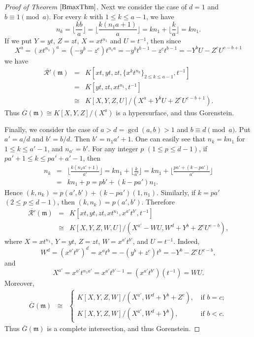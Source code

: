 \documentclass[12pt]{amsart}
\theoremstyle{definition}
\theoremstyle{remark}
\numberwithin{equation}{section}
\newcommand{\m}{\mathfrak m}
\renewcommand{\:}{\colon}
\begin{document}
\begin{proof}[Proof of Theorem $\ref{BmaxThm}$]
\par \vspace{2mm}
Next we consider the case of $d=1$ and $b \equiv 1 \pmod{a}$. 
For every $k$ with $1 \le k \le a-1$, we have 
\[
n_k
=\lfloor \frac{kb}{a} \rfloor 
= \lfloor \frac{k(n_1a+1)}{a} \rfloor
=kn_1+ \lfloor \dfrac{k}{a} \rfloor = kn_1. 
\]
If we put $Y=yt$, $Z=zt$, $X=xt^{n_1}$ and $U=t^{-1}$,  
then since 
\[
X^a=(xt^{n_1})^a=(-y^b-z^c)t^{n_1a} 
=-y^bt^{b-1}-z^c t^{b-1} 
= -Y^bU-Z^cU^{c-b+1} 
\]
we have 
\begin{eqnarray*}
\overline{\mathcal{R}'}(\m) &=& 
 K[xt, yt, zt, \{x^kt^{n_k}\}_{2 \le k \le a-1}, t^{-1}] \\
&=&  K[yt,zt,xt^{n_1},t^{-1}] \\
& \cong &  K[X,Y,Z,U]/(X^a+Y^bU+Z^cU^{c-b+1}). 
\end{eqnarray*}
Thus $\overline{G}(\m) \cong  K[X,Y,Z]/(X^a)$ is 
a hypersurface, and thus Gorenstein. 
\par \vspace{2mm} 
Finally, we consider the case of $a>  d=\gcd(a,b)>1$ and 
$b \equiv d \pmod{a}$. 
Put $a'=a/d$ and $b'=b/d$. Then $b'=n_1a'+1$.  
One can easily see that $n_k=kn_1$ for $1 \le k \le a'-1$, 
and $n_{a'}=b'$. 
For any integer $p$ $(1\le p \le d-1)$, if $pa'+1 \le k \le pa'+a'-1$, 
then 
\begin{eqnarray*}
n_{k} &=& \lfloor \frac{k(n_1a'+1)}{a'} \rfloor 
= kn_1+ \lfloor \frac{k}{a'} \rfloor = kn_1+ \lfloor \frac{pa'+(k-pa')}{a'} \rfloor \\[1mm]
&=& kn_1+p = pb'+(k-pa')n_1. 
\end{eqnarray*}
Hence $(k,n_k)=p(a',b')+(k-pa')(1,n_1)$. 
Similarly, if $k=pa'$ $(2 \le p \le d-1)$, then $(k,n_k)=p(a',b')$. 
Therefore
\begin{eqnarray*}
\overline{\mathcal{R}'}(\m) 
&=& K[xt,yt,zt,xt^{n_1},x^{a'}t^{b'},t^{-1}] \\[1mm]
& \cong & K[X,Y,Z,W,U]/(X^{a'}-WU, W^d+Y^b+Z^cU^{c-b}),
\end{eqnarray*} 
where $X=xt^{n_1}$, $Y=yt$, $Z=zt$, $W=x^{a'}t^{b'}$, and $U=t^{-1}$. 
Indeed, 
\[
W^d=(x^{a'}t^{b'})^d = x^at^b=-(y^b+z^c)t^b=-Y^b-Z^cU^{c-b}, 
\]
and 
\[
 X^{a'}=x^{a'}t^{n_1a'}=x^{a'}t^{b'-1}=(x^{a'}t^{b'})(t^{-1})=WU.
\]
Moreover, 
\begin{eqnarray*}
\overline{G}(\m) 
& \cong &
\left\{
\begin{array}{ll}
K[X,Y,Z,W]/(X^{a'}, W^d+Y^b+Z^c), &\, \text{if $b=c$}; \\[1mm]  
K[X,Y,Z,W]/(X^{a'}, W^d+Y^b), & \, \text{if $b<c$}. 
\end{array}
\right.
\end{eqnarray*}
Thus $\overline{G}(\m)$ is a complete intersection, and thus Gorenstein. 
\end{proof}
\end{document}
